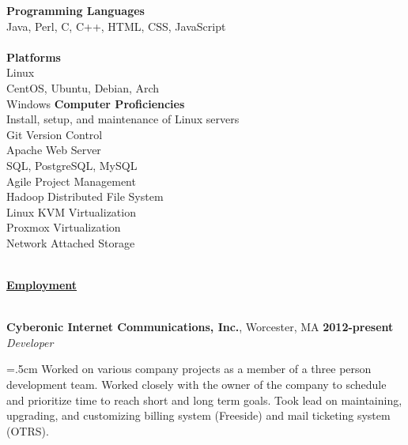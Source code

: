 \documentclass[10pt,notitlepage]{article}
\newenvironment{area}
	{
		\vspace{1em}
		\fontfamily{\sfdefault}\selectfont\begin{singlespace}
	}
	{\\\hrulefill\end{singlespace}\par}
\newcommand{\areaName}[1]{
	\noindent \uline{\hfill\phantom{.}}\\
	\uline{\phantom{.}\hfill{\Large\textbf{#1}}\hfill\phantom{.}}\\
}
\newcommand{\B}[1]{\textbf{#1}}
\newcommand{\I}[1]{\textit{#1}}
\begin{document}
\noindent \B{Programming Languages} \\
\indent Java, Perl, C, C++, HTML, CSS, JavaScript\\\\
\noindent \B{Platforms} \\
\indent Linux \\
\indent \indent CentOS, Ubuntu, Debian, Arch \\
\indent Windows 
\newpage
\noindent \B{Computer Proficiencies} \\
	\indent Install, setup, and maintenance of Linux servers \\
	\indent Git Version Control \\
	\indent Apache Web Server \\
	\indent SQL, PostgreSQL, MySQL \\
	\indent Agile Project Management \\
	\indent Hadoop Distributed File System \\
	\indent Linux KVM Virtualization \\
	\indent Proxmox Virtualization \\
	\indent Network Attached Storage

\begin{area}
	\areaName{Employment}
\end{area}

\noindent \B{Cyberonic Internet Communications, Inc.}, Worcester, MA
\hfill\B{2012-present}\\
\I{Developer}

\hangindent=.5cm Worked on various company projects as a member of a three person
development team. Worked closely with the owner of the company to schedule and
prioritize time to reach short and long term goals. Took lead on maintaining,
upgrading, and customizing billing system (Freeside) and mail ticketing system (OTRS).\\
\end{document}
